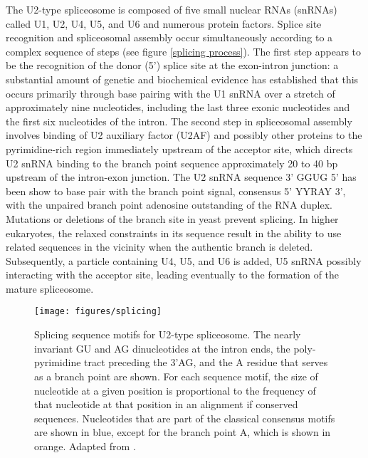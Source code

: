 The U2-type spliceosome is composed of five small nuclear RNAs
(snRNAs) called U1, U2, U4, U5, and U6 and numerous protein
factors. Splice site recognition and spliceosomal assembly occur
simultaneously according to a complex sequence of steps (see figure
\ref{splicing process}).  The first step appears to be the recognition
of the donor (5') splice site at the exon-intron junction: a
substantial amount of genetic and biochemical evidence has established
that this occurs primarily through base pairing with the U1 snRNA over
a stretch of approximately nine nucleotides, including the last three
exonic nucleotides and the first six nucleotides of the intron. The
second step in spliceosomal assembly involves binding of U2 auxiliary
factor (U2AF) and possibly other proteins to the pyrimidine-rich
region immediately upstream of the acceptor site, which directs U2
snRNA binding to the branch point sequence approximately 20 to 40 bp
upstream of the intron-exon junction.  The U2 snRNA sequence 3' GGUG
5' has been show to base pair with the branch point signal, consensus
5' YYRAY 3', with the unpaired branch point adenosine outstanding of
the RNA duplex.  Mutations or deletions of the branch site in yeast
prevent splicing. In higher eukaryotes, the relaxed constraints in its
sequence result in the ability to use related sequences in the
vicinity when the authentic branch is deleted. Subsequently, a
particle containing U4, U5, and U6 is added, U5 snRNA possibly
interacting with the acceptor site, leading eventually to the
formation of the mature spliceosome.

\begin{figure}
\begin{center}
\texttt{[image: figures/splicing]}
\caption[Classical splicing signals]{Splicing sequence motifs 
for U2-type spliceosome. The nearly invariant GU and AG dinucleotides
at the intron ends, the poly-pyrimidine tract preceding the 3'AG, and
the A residue that serves as a branch point are shown. For each
sequence motif, the size of nucleotide at a given position is
proportional to the frequency of that nucleotide at that position in
an alignment if conserved sequences. Nucleotides that are part of the
classical consensus motifs are shown in blue, except for the branch
point A, which is shown in orange. Adapted from
\cite{cartegni:2002}.}
\label{splice signals}
\end{center}
\end{figure}

